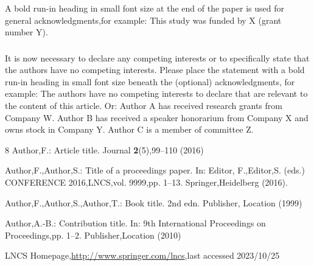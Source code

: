 \documentclass[runningheads]{llncs}
\begin{document}
\begin{credits}
\subsubsection{\ackname} A bold run-in heading in small font size at the end of the paper is
used for general acknowledgments,for example: This study was funded
by X (grant number Y).

\subsubsection{\discintname}
It is now necessary to declare any competing interests or to specifically
state that the authors have no competing interests. Please place the
statement with a bold run-in heading in small font size beneath the
(optional) acknowledgments,
for example: The authors have no competing interests to declare that are
relevant to the content of this article. Or: Author A has received research
grants from Company W. Author B has received a speaker honorarium from
Company X and owns stock in Company Y. Author C is a member of committee Z.
\end{credits}
%
%
%
% 
% 
%
\begin{thebibliography}{8}
Author,F.: Article title. Journal \textbf{2}(5),99--110 (2016)

Author,F.,Author,S.: Title of a proceedings paper. In: Editor,
F.,Editor,S. (eds.) CONFERENCE 2016,LNCS,vol. 9999,pp. 1--13.
Springer,Heidelberg (2016). 

Author,F.,Author,S.,Author,T.: Book title. 2nd edn. Publisher,
Location (1999)

Author,A.-B.: Contribution title. In: 9th International Proceedings
on Proceedings,pp. 1--2. Publisher,Location (2010)

LNCS Homepage,\url{http://www.springer.com/lncs},last accessed 2023/10/25
\end{thebibliography}
\end{document}
